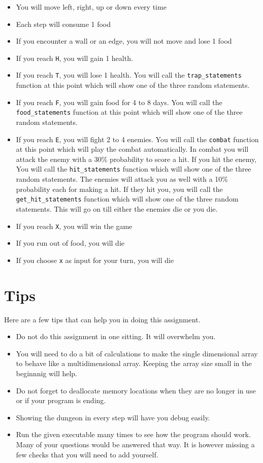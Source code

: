 \documentclass[a4paper,12pt]{article}
\begin{document}
\begin{itemize}
\item You will move left, right, up or down every time
\item Each step will consume 1 food
\item If you encounter a wall or an edge, you will not move and lose 1 food
\item If you reach {\tt H}, you will gain 1 health.
\item If you reach {\tt T}, you will lose 1 health. You will call the {\tt trap\_statements} function at this point which will show one of the three random statements.
\item If you reach {\tt F}, you will gain food for 4 to 8 days. You will call the {\tt food\_statements} function at this point which will show one of the three random statements.
\item If you reach {\tt E}, you will fight 2 to 4 enemies. You will call the {\tt combat} function at this point which will play the combat automatically. In combat you will attack the enemy with a 30\% probability to score a hit. If you hit the enemy,  You will call the {\tt hit\_statements} function which will show one of the three random statements. The enemies will attack you as well with a 10\% probability each for making a hit. If they hit you, you will call the {\tt get\_hit\_statements} function which will show one of the three random statements. This will go on till either the enemies die or you die.
\item If you reach {\tt X}, you will win the game
\item If you run out of food, you will die
\item If you choose {\tt x} as input for your turn, you will die
\end{itemize}

\section{Tips}
Here are a few tips that can help you in doing this assignment.

\begin{itemize}
\item Do not do this assignment in one sitting. It will overwhelm you.
\item You will need to do a bit of calculations to make the single dimensional array to behave like a multidimensional array. Keeping the array size small in the beginnnig will help.
\item Do not forget to deallocate memory locations when they are no longer in use or if your program is ending.
\item Showing the dungeon in every step will have you debug easily.
\item Run the given executable many times to see how the program should work. Many of your questions would be answered that way. It is however missing a few checks that you will need to add yourself.
\end{itemize}
\end{document}
